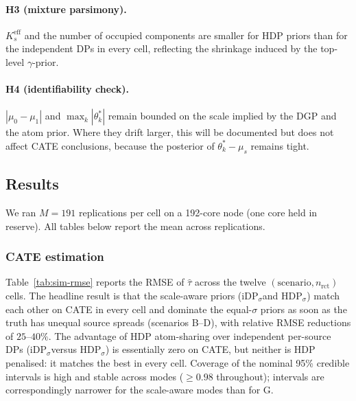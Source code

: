 \documentclass[11pt]{article}
\theoremstyle{plain}
\theoremstyle{definition}
\theoremstyle{remark}
\newcommand{\1}{\mathds{1}}
\newcommand{\mGauss}{\ensuremath{\mathrm{G}}}
\newcommand{\miDPs}{\ensuremath{\mathrm{iDP}_\sigma}}
\newcommand{\mHDPs}{\ensuremath{\mathrm{HDP}_\sigma}}
\begin{document}
\paragraph{H3 (mixture parsimony).}
$K^{\text{eff}}_s$ and the number of occupied components are smaller
for HDP priors than for the independent DPs in every cell, reflecting
the shrinkage induced by the top-level $\gamma$-prior.

\paragraph{H4 (identifiability check).}
$|\mu_0 - \mu_1|$ and $\max_k |\theta_k^*|$ remain bounded on the scale
implied by the DGP and the atom prior. Where they drift larger, this
will be documented but does not affect CATE conclusions, because the
posterior of $\theta_k^* - \mu_s$ remains tight.

\subsection{Results}
\label{sec:sim-results}

We ran $M = 191$ replications per cell on a 192-core node
(one core held in reserve). All tables below report the mean across
replications.

\subsubsection*{CATE estimation}

Table~\ref{tab:sim-rmse} reports the RMSE of $\hat\tau$ across the
twelve $(\text{scenario}, n_{\text{rct}})$ cells. The headline result
is that the scale-aware priors (\miDPs and
\mHDPs) match each other on CATE in every cell
and dominate the equal-$\sigma$ priors as soon as the truth has
unequal source spreads (scenarios B--D), with relative RMSE
reductions of $25\text{--}40\%$. The advantage of HDP atom-sharing
over independent per-source DPs (\miDPs versus
\mHDPs) is essentially zero on CATE, but neither
is HDP penalised: it matches the best in every cell. Coverage of the
nominal 95\% credible intervals is high and stable across modes
($\geq 0.98$ throughout); intervals are correspondingly narrower for
the scale-aware modes than for \mGauss.
\end{document}

